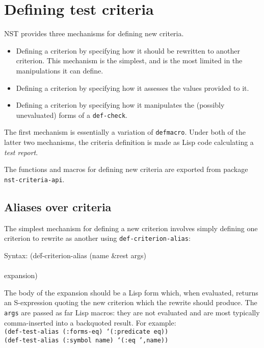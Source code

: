 \section{Defining test criteria}
NST provides three mechanisms for defining new criteria.
\begin{itemize}
\item Defining a criterion by specifying how it should be rewritten to
  another criterion.  This mechanism is the simplest, and is the most
  limited in the manipulations it can define.
\item Defining a criterion by specifying how it assesses the values
  provided to it.
\item Defining a criterion by specifying how it manipulates the
  (possibly unevaluated) forms of a \texttt{def-check}.
\end{itemize}
The first mechanism is essentially a variation of \texttt{defmacro}.
Under both of the latter two mechanisms, the criteria definition is
made as Lisp code calculating a \emph{test report}.

The functions and macros for defining new criteria are exported from
package \texttt{nst-criteria-api}.

\subsection{Aliases over criteria}
\label{sec:def-criterion-alias}
The simplest mechanism for defining a new criterion involves simply
defining one criterion to rewrite as another using
\texttt{def-criterion-alias}:
%
{\ttfamily\begin{tabbing}
\textrm{Syntax: 
}(de\=f-criterion-alias (name \&rest args)
\\ \> [ documentation ]
\\ \> expansion)
\end{tabbing}}
The body of the expansion should be a Lisp form which, when evaluated,
returns an S-expression quoting the new criterion which the rewrite
should produce.  The \texttt{args} are passed as far Lisp macros: they
are not evaluated and are most typically comma-inserted into a
backquoted result.  For example:
\\ \texttt{(def-test-alias (:forms-eq) `(:predicate eq))}
\\ \texttt{(def-test-alias (:symbol name) `(:eq ',name))}

